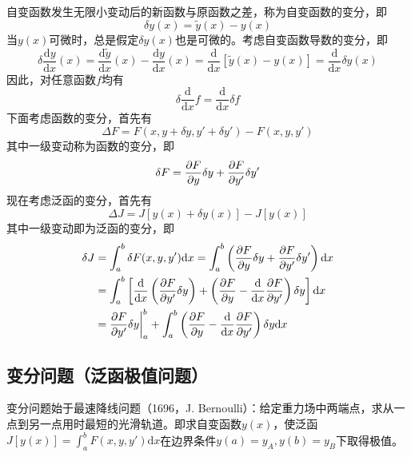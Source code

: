 自变函数发生无限小变动后的新函数与原函数之差，称为{\heiti 自变函数的变分}，即
\begin{equation*}
	\delta y(x) = \tilde{y}(x) - y(x)
\end{equation*}
当$y(x)$可微时，总是假定$\delta y(x)$也是可微的。考虑自变函数导数的变分，即
\begin{equation*}
	\delta \frac{\mathrm{d}y}{\mathrm{d}x}(x) = \frac{\mathrm{d}\tilde{y}}{\mathrm{d}x}(x) - \frac{\mathrm{d}y}{\mathrm{d}x}(x) = \frac{\mathrm{d}}{\mathrm{d}x}\left[\tilde{y}(x) - y(x)\right] = \frac{\mathrm{d}}{\mathrm{d} x} \delta y(x)
\end{equation*}
因此，对任意函数$f$均有
\begin{equation}
	\delta \frac{\mathrm{d}}{\mathrm{d} x} f = \frac{\mathrm{d}}{\mathrm{d} x} \delta f
\end{equation}
下面考虑函数的变分，首先有
\begin{equation*}
	\Delta F = F(x,y+\delta y,y'+\delta y') - F(x,y,y')
\end{equation*}
其中一级变动称为函数的变分，即
\begin{equation*}
	\delta F = \frac{\partial F}{\partial y} \delta y + \frac{\partial F}{\partial y'} \delta y'
\end{equation*}
现在考虑泛函的变分，首先有
\begin{equation*}
	\Delta J = J\left[y(x)+\delta y(x)\right] - J\left[y(x)\right]
\end{equation*}
其中一级变动即为泛函的变分，即
\begin{align*}
	\delta J & = \int_a^b \delta F(x,y,y') \mathrm{d} x = \int_a^b \left(\frac{\partial F}{\partial y} \delta y + \frac{\partial F}{\partial y'} \delta y'\right) \mathrm{d} x \\
	& = \int_a^b \left[\frac{\mathrm{d}}{\mathrm{d} x} \left(\frac{\partial F}{\partial y'} \delta y\right) + \left(\frac{\partial F}{\partial y} - \frac{\mathrm{d}}{\mathrm{d} x} \frac{\partial F}{\partial y'}\right) \delta y \right] \mathrm{d} x \\
	& = \frac{\partial F}{\partial y'} \delta y \bigg|_a^b + \int_a^b \left(\frac{\partial F}{\partial y} - \frac{\mathrm{d}}{\mathrm{d} x} \frac{\partial F}{\partial y'}\right) \delta y \mathrm{d} x
\end{align*}

\subsection{变分问题（泛函极值问题）}

变分问题始于最速降线问题（1696，J. Bernoulli）：给定重力场中两端点，求从一点到另一点用时最短的光滑轨道。即求自变函数$y(x)$，使泛函$\displaystyle J[y(x)] = \int_a^b F(x,y,y') \mathrm{d} x$在边界条件$y(a) = y_A,y(b) = y_B$下取得极值。

